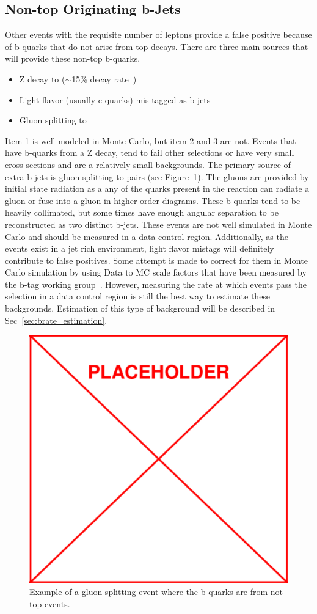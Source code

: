 \subsection{Non-top Originating b-Jets}
Other events with the requisite number of leptons provide a false positive because of b-quarks that do not arise from top decays. There are three main sources that will provide these non-top b-quarks.
\begin{itemize}
\item Z decay to \bbbar ($\sim$15\% decay rate~\cite{pdg})
\item Light flavor (usually c-quarks) mis-tagged as b-jets
\item Gluon splitting to \bbbar
\end{itemize}

Item 1 is well modeled in Monte Carlo, but item 2 and 3 are not. Events that have b-quarks from a Z decay, tend to fail other selections or have very small cross sections and are a relatively small backgrounds. The primary source of extra b-jets is gluon splitting to \bbbar pairs (see Figure~\ref{fig:gluon_splitting}). The gluons are provided by initial state radiation as a any of the quarks present in the reaction can radiate a gluon or fuse into a gluon in higher order diagrams. These b-quarks tend to be heavily collimated, but some times have enough angular separation to be reconstructed as two distinct b-jets. These events are not well simulated in Monte Carlo and should be measured in a data control region. Additionally, as the \ttZ events exist in a jet rich environment, light flavor mistags will definitely contribute to false positives. Some attempt is made to correct for them in Monte Carlo simulation by using Data to MC scale factors that have been measured by the b-tag working group~\cite{BTV11003}. However, measuring the rate at which events pass the selection in a data control region is still the best way to estimate these backgrounds. Estimation of this type of background will be described in Sec~\ref{sec:brate_estimation}. \\

			\begin{figure}[h]
\begin{center}
\includegraphics[width=0.48\linewidth]{Figs/placeholder.pdf}
\caption{\label{fig:gluon_splitting}
Example of a gluon splitting event where the b-quarks are from not top events.
}
\end{center}
\end{figure} 


